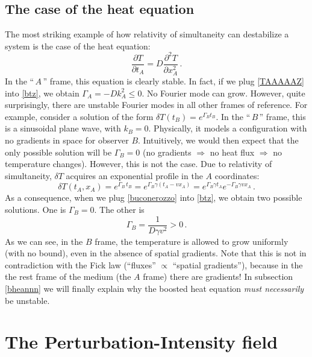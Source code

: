 \documentclass[a4paper, amsfonts, amssymb, amsmath, reprint, showkeys,  twoside, onecolumn,notitlepage,nofootinbib]{revtex4-1}
\theoremstyle{definition}
\theoremstyle{theorem}
\begin{document}
\subsection{The case of the heat equation}

The most striking example of how relativity of simultaneity can destabilize a system is the case of the heat equation:
\begin{equation}\label{btz}
\dfrac{\partial T}{\partial t_A} = D \dfrac{\partial^2 T}{\partial x_A^2} \, .
\end{equation}
In the ``$\, A \,$'' frame, this equation is clearly stable. In fact, if we plug \eqref{TAAAAAZ} into \eqref{btz}, we obtain $\Gamma_A=-Dk_A^2 \leq 0$. No Fourier mode can grow. However, quite surprisingly, there are unstable Fourier modes in all other frames of reference. For example, consider a solution of the form $\delta T(t_B)=e^{\Gamma_B t_B}$. In the ``$\, B \,$'' frame, this is a sinusoidal plane wave, with $k_B=0$. Physically, it models a configuration with no gradients in space for observer $B$. Intuitively, we would then expect that the only possible solution will be $\Gamma_B=0$ (no gradients $\Rightarrow$ no heat flux $\Rightarrow$ no temperature changes). However, this is not the case. Due to relativity of simultaneity, $\delta T$ acquires an exponential profile in the $A$ coordinates:
\begin{equation}\label{buconerozzo}
\delta T(t_A,x_A) =e^{\Gamma_B \, t_B} = e^{\Gamma_B \gamma (t_A-v x_A)} = e^{\Gamma_B \gamma t_A} e^{-\Gamma_B \gamma v x_A} \, .
\end{equation}
As a consequence, when we plug \eqref{buconerozzo} into \eqref{btz}, we obtain two possible solutions. One is $\Gamma_B = 0$. The other is
\begin{equation}
\Gamma_B = \dfrac{1}{D\gamma v^2} >0 \, .
\end{equation}
As we can see, in the $ B $ frame, the temperature is allowed to grow uniformly (with no bound), even in the absence of spatial gradients. Note that this is not in contradiction with the Fick law (``fluxes'' $\propto$ ``spatial gradients''), because in the the rest frame of the medium (the $A$ frame) there are gradients! In subsection \ref{bheannn} we will finally explain why the boosted heat equation \textit{must necessarily} be unstable.



\section{The Perturbation-Intensity field}\label{appendoxB}
\end{document}
